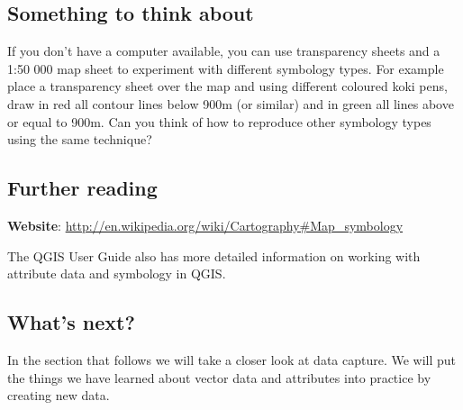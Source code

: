 \subsection{Something to think about}

If you don't have a computer available, you can use transparency sheets and a
1:50 000 map sheet to experiment with different symbology types. For example
place a transparency sheet over the map and using different coloured koki
pens, draw in red all contour lines below 900m (or similar) and in green all
lines above or equal to 900m. Can you think of how to reproduce other
symbology types using the same technique?

\subsection{Further reading}

\textbf{Website}: \url{http://en.wikipedia.org/wiki/Cartography#Map_symbology}

The QGIS User Guide also has more detailed information on working with
attribute data and symbology in QGIS.

\subsection{What's next?}

In the section that follows we will take a closer look at data capture. We
will put the things we have learned about vector data and attributes into
practice by creating new data.

